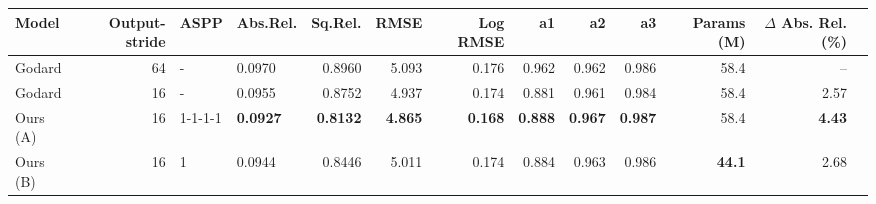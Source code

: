 \begin{tabular}{lrllrrrrrrrrr}
\toprule
 Model & Output-stride &     ASPP &  Abs.Rel. &  Sq.Rel. &   RMSE &  Log RMSE &     a1 &     a2 &     a3 &      Params (M) & $\Delta$ Abs. Rel. (\%)\\
\midrule
       Godard & 64  &      - &    0.0970 &   0.8960 &  5.093 &     0.176 &  0.962 &  0.962 &  0.986 &         58.4 & -- \\
       Godard & 16 & - & 0.0955 & 0.8752 &      4.937 &      0.174 &     0.881 &      0.961 &    0.984 & 58.4 & 2.57 \\
            Ours (A) & 16 &  1-1-1-1 &    \textbf{0.0927} &   \textbf{0.8132} &  \textbf{4.865} &     \textbf{0.168} &  \textbf{0.888} &  \textbf{0.967} &  \textbf{0.987} &         58.4 & \textbf{4.43} \\
            Ours (B) & 16 &   1 &    0.0944 &   0.8446 &  5.011 &     0.174 &  0.884 &  0.963 &  0.986 &         \textbf{44.1} & 2.68 \\ \bottomrule \end{tabular}